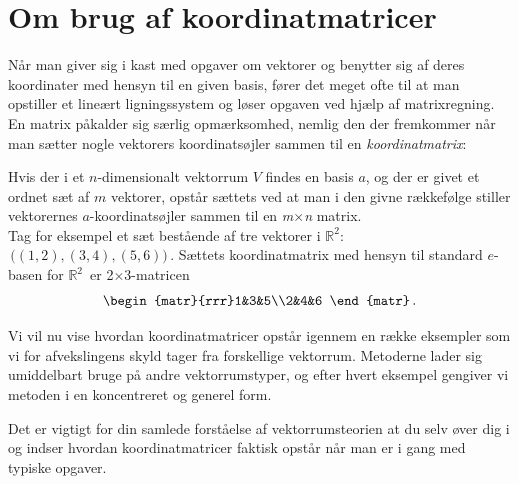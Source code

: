 \section{Om brug af koordinatmatricer}\label{tn7.AfsnitKoordMatrix}
Når man giver sig i kast med opgaver om vektorer og benytter sig af deres koordinater med hensyn til en given basis, fører det meget ofte til at man opstiller et lineært ligningssystem og løser opgaven ved hjælp af matrixregning. En matrix påkalder sig særlig opmærksomhed, nemlig den der fremkommer når man sætter nogle vektorers koordinatsøjler sammen til en \textit{koordinatmatrix}:
\begin{explain}
Hvis der i et $n$-dimensionalt vektorrum $V$ findes en basis $a$, og der er givet et ordnet sæt af $m$ vektorer, opstår sættets  ved at man i den givne rækkefølge stiller vektorernes $a$-koordinatsøjler sammen til en \textit{m}$\times$\textit{n} matrix.
\medskip\\
Tag for eksempel et sæt bestående af tre vektorer i $\mathbb R^2:$  $\,\big((1,2),(3,4),(5,6)\big )\,$. Sættets koordinatmatrix med hensyn til standard $e$-basen for  $\mathbb R^2\,$ er 2$\times$3-matricen
$$
\begin{matr}{rrr}1&3&5\\2&4&6 \end{matr}\,.
$$
\end{explain}

Vi vil nu vise hvordan koordinatmatricer opstår igennem en række eksempler som vi for afvekslingens skyld tager fra forskellige vektorrum. Metoderne lader sig umiddelbart bruge på andre vektorrumstyper, og efter hvert eksempel gengiver vi metoden i en koncentreret og generel form.

\begin{obs}
Det er vigtigt for din samlede forståelse af vektorrumsteorien at du selv øver dig i og indser hvordan koordinatmatricer faktisk opstår når man er i gang med typiske opgaver.
\end{obs}
